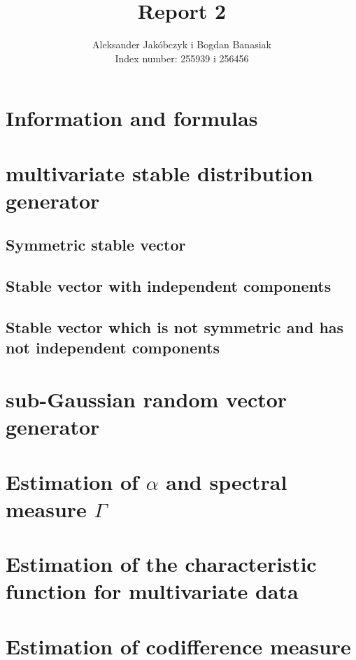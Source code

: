 \documentclass{article}
\title{Report 2}
\author{Aleksander Jakóbczyk i Bogdan Banasiak\\ 
	Index number: 255939 i 256456}
\date{}\date{}
\begin{document}
	
	\maketitle
	
	\section{Information and formulas}
	
	\section{multivariate stable distribution generator}
	\subsection{Symmetric stable vector}
	
	\subsection{Stable vector with independent components}
	
	\subsection{Stable vector which is not symmetric and has not independent components}
	
	
	\section{sub-Gaussian random vector generator}
	
	
	
	\section{Estimation of $\alpha$ and spectral measure $\Gamma$}
	
	
	\section{Estimation of the characteristic function for multivariate data}
	
	\section{Estimation of codifference measure}
	
\end{document}
